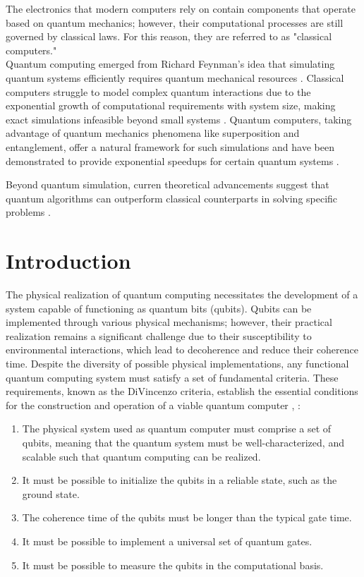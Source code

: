 The electronics that modern computers rely on contain components that operate based on quantum mechanics; however, their computational processes are still governed by classical laws. 
For this reason, they are referred to as "classical computers."\\

Quantum computing emerged from Richard Feynman’s idea that simulating quantum systems efficiently requires quantum mechanical resources \cite{Feynman1982}. 
Classical computers struggle to model complex quantum interactions due to the exponential growth of computational requirements with system size, making exact simulations infeasible beyond small systems \cite{Brown2010}. 
Quantum computers, taking advantage of quantum mechanics phenomena like superposition and entanglement, offer a natural framework for such simulations and have been demonstrated to provide exponential speedups for certain quantum systems \cite{Georgescu_2014}.

Beyond quantum simulation, curren theoretical advancements suggest that quantum algorithms can outperform classical counterparts in solving specific problems \cite{Montanaro2016}.

\section{Introduction}
The physical realization of quantum computing necessitates the development of a system capable of functioning as quantum bits (qubits). 
Qubits can be implemented through various physical mechanisms; however, their practical realization remains a significant challenge due to their susceptibility to environmental interactions, which lead to decoherence and reduce their coherence time. 
Despite the diversity of possible physical implementations, any functional quantum computing system must satisfy a set of fundamental criteria. 
These requirements, known as the DiVincenzo criteria, establish the essential conditions for the construction and operation of a viable quantum computer \cite{DiVincenzo_2000}, \cite{Manenti:2023zzn}:
\begin{enumerate}
    \item The physical system used as quantum computer must comprise a set of qubits, meaning that the quantum system must be well-characterized, and scalable such that quantum
    computing can be realized.
    \item It must be possible to initialize the qubits in a reliable state, such as the ground state.
    \item The coherence time of the qubits must be longer than the typical gate time.
    \item It must be possible to implement a universal set of quantum gates.
    \item It must be possible to measure the qubits in the computational basis.
\end{enumerate}

